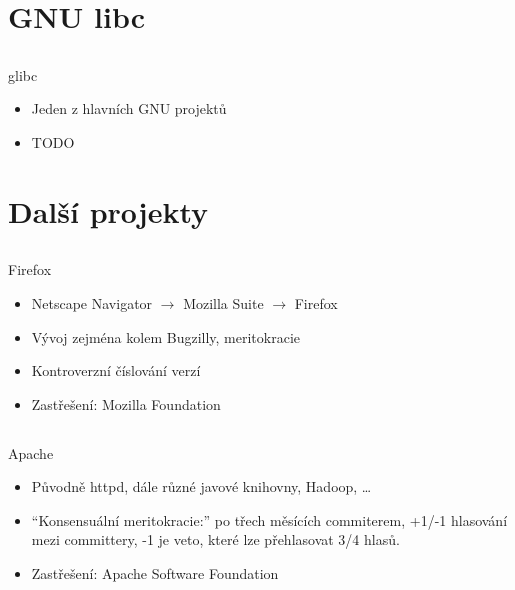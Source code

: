 \documentclass{beamer}
\begin{document}
\section{GNU libc}

\subsection{}
\begin{frame}{glibc}
\begin{itemize}
\item Jeden z hlavních GNU projektů
\item TODO
\end{itemize}
\end{frame}


\section{Další projekty}

\subsection{}
\begin{frame}{Firefox}
\begin{itemize}
\item Netscape Navigator $\rightarrow$ Mozilla Suite $\rightarrow$ Firefox
\item Vývoj zejména kolem Bugzilly, meritokracie
\item Kontroverzní číslování verzí
\item Zastřešení: Mozilla Foundation
\end{itemize}
\end{frame}

\subsection{}
\begin{frame}{Apache}
\begin{itemize}
\item Původně httpd, dále různé javové knihovny, Hadoop, \dots
\item ``Konsensuální meritokracie:'' po třech měsících commiterem, +1/-1 hlasování mezi committery, -1 je veto, které lze přehlasovat 3/4 hlasů.
\item Zastřešení: Apache Software Foundation
\end{itemize}
\end{frame}
\end{document}

